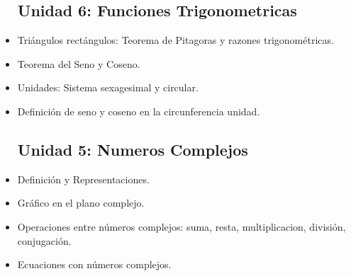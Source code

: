 \documentclass[a4paper,10pt,spanish,sans]{exam}
\begin{document}
\begin{itemize}
		\subsection*{Unidad 6: Funciones Trigonometricas}
		\item Triángulos rectángulos: Teorema de Pitagoras y razones trigonométricas.
		\item Teorema del Seno y Coseno.
		\item Unidades: Sistema sexagesimal y circular.
		\item Definición de seno y coseno en la circunferencia unidad.
		
		\subsection*{Unidad 5: Numeros Complejos}
		\item Definición y Representaciones.
		\item Gráfico en el plano complejo.
		\item Operaciones entre números complejos: suma, resta, multiplicacion, división, conjugación.
		\item Ecuaciones con números complejos.
		
		
	\end{itemize}
	
	
\end{document}
